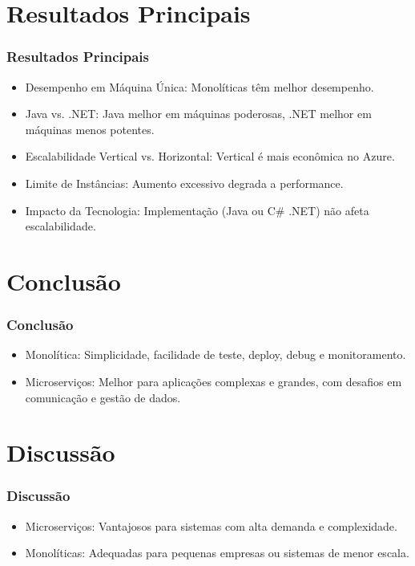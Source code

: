 \documentclass{beamer}
\begin{document}
\section{Resultados Principais}

\begin{frame}
\frametitle{Resultados Principais}
\begin{itemize}
    \item Desempenho em Máquina Única: Monolíticas têm melhor desempenho.
    \item Java vs. .NET: Java melhor em máquinas poderosas, .NET melhor em máquinas menos potentes.
    \item Escalabilidade Vertical vs. Horizontal: Vertical é mais econômica no Azure.
    \item Limite de Instâncias: Aumento excessivo degrada a performance.
    \item Impacto da Tecnologia: Implementação (Java ou C\# .NET) não afeta escalabilidade.
\end{itemize}
\end{frame}



\section{Conclusão}

\begin{frame}
\frametitle{Conclusão}
\begin{itemize}
    \item Monolítica: Simplicidade, facilidade de teste, deploy, debug e monitoramento.
    \item Microserviços: Melhor para aplicações complexas e grandes, com desafios em comunicação e gestão de dados.
\end{itemize}
\end{frame}

\section{Discussão}

\begin{frame}
\frametitle{Discussão}
\begin{itemize}
    \item Microserviços: Vantajosos para sistemas com alta demanda e complexidade.
    \item Monolíticas: Adequadas para pequenas empresas ou sistemas de menor escala.
\end{itemize}
\end{frame}
\end{document}
